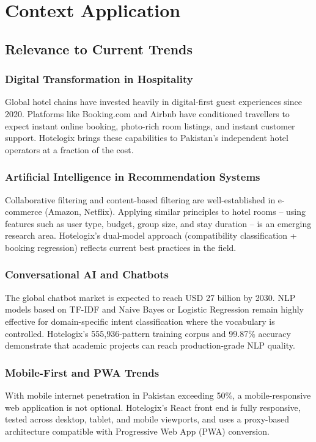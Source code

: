\documentclass[12pt,a4paper]{report}
\begin{document}
\chapter{Context Application}

\section{Relevance to Current Trends}

\subsection*{Digital Transformation in Hospitality}
Global hotel chains have invested heavily in digital-first guest experiences since 2020. Platforms like Booking.com and Airbnb have conditioned travellers to expect instant online booking, photo-rich room listings, and instant customer support. Hotelogix brings these capabilities to Pakistan's independent hotel operators at a fraction of the cost.

\subsection*{Artificial Intelligence in Recommendation Systems}
Collaborative filtering and content-based filtering are well-established in e-commerce (Amazon, Netflix). Applying similar principles to hotel rooms -- using features such as user type, budget, group size, and stay duration -- is an emerging research area. Hotelogix's dual-model approach (compatibility classification + booking regression) reflects current best practices in the field.

\subsection*{Conversational AI and Chatbots}
The global chatbot market is expected to reach USD 27 billion by 2030. NLP models based on TF-IDF and Naive Bayes or Logistic Regression remain highly effective for domain-specific intent classification where the vocabulary is controlled. Hotelogix's 555,936-pattern training corpus and 99.87\% accuracy demonstrate that academic projects can reach production-grade NLP quality.

\subsection*{Mobile-First and PWA Trends}
With mobile internet penetration in Pakistan exceeding 50\%, a mobile-responsive web application is not optional. Hotelogix's React front end is fully responsive, tested across desktop, tablet, and mobile viewports, and uses a proxy-based architecture compatible with Progressive Web App (PWA) conversion.
\end{document}
